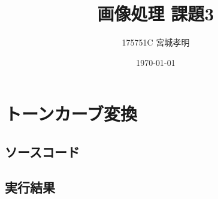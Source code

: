 \documentclass[a4paper,11pt,titlepage]{bxjsarticle}
\title{画像処理 課題3}
\author{175751C 宮城孝明}
\date{\today}
\begin{document}
\maketitle
\tableofcontents
\clearpage
\section{トーンカーブ変換}
\subsection{ソースコード}

  
\subsection{実行結果}
\end{document}
